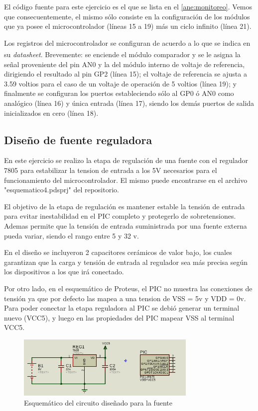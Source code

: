 \documentclass[a4paper]{article}
\let\originalcite\cite
\renewcommand{\cite}[2][]{\textsuperscript{\originalcite{#2}}}
\newenvironment{ejercicios}
    {\setcounter{secnumdepth}{3}
    \renewcommand\thesubsection{Ejercicio \arabic{subsection}}}
    {\setcounter{secnumdepth}{0}}
\begin{document}
\begin{ejercicios}
    El código fuente para este ejercicio es el que se lista en el 
    \ref{ane:monitoreo}. Vemos que consecuentemente, el mismo sólo
    consiste en la configuración de los módulos que ya posee el 
    microcontrolador (líneas 15 a 19) más un ciclo infinito (línea 21).

    Los registros del microcontrolador se configuran de acuerdo a lo 
    que se indica en su \textit{datasheet}\cite{bid:datasheet}. 
    Brevemente: se enciende el módulo comparador y se le asigna la
    señal proveniente del pin AN0 y la del módulo interno de voltaje 
    de referencia, dirigiendo el resultado al pin GP2 (línea 15); el 
    voltaje de referencia se ajusta a 3.59 voltios para el caso de un
    voltaje de operación de 5 voltios (línea 19); y finalmente se 
    configuran los puertos estableciendo sólo al GP0 ó AN0 como 
    analógico (línea 16) y única entrada (línea 17), siendo los demás
    puertos de salida inicializados en cero (línea 18).

    \subsection{Diseño de fuente reguladora}
    En este ejercicio se realizo la etapa de regulación de una fuente con el
    regulador 7805 para estabilizar la tension de entrada a los 5V necesarios para el 
    funcionamiento del microcontrolador. El mismo puede encontrarse en el 
    archivo "esquematico4.pdsprj" del repositorio.

    El objetivo de la etapa de regulación es mantener estable la tensión de entrada 
    para evitar inestabilidad en el PIC completo y protegerlo de sobretensiones. Ademas permite 
    que la tensión de entrada suministrada por una fuente externa pueda variar, siendo el rango entre 5 y 32 v.

    En el diseño se incluyeron 2 capacitores cerámicos de valor bajo, los cuales garantizan que la carga y 
    tensión de entrada al regulador sea más precisa según los dispositivos a los que irá conectado.

    Por otro lado, en el esquemático de Proteus, el PIC no muestra las conexiones de tensión ya que por defecto
    las mapea a una tension de VSS = 5v y VDD = 0v. Para poder conectar la etapa reguladora al PIC se debió
    generar un terminal nuevo (VCC5), y luego en las propiedades del PIC mapear VSS al terminal VCC5.

    \begin{figure}[h]\centering
        \includegraphics[height=3cm]{esquematico4.png}
        \caption{Esquemático del circuito diseñado para la fuente}
    \end{figure}




\end{ejercicios}
\end{document}
